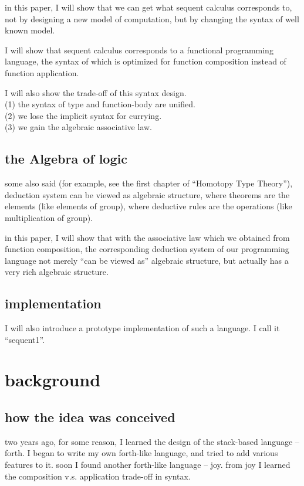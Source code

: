 \documentclass{sigplanconf}
\begin{document}
in this paper, I will show that
we can get what sequent calculus corresponds to,
not by designing a new model of computation,
but by changing the syntax of well known model.

I will show that
sequent calculus corresponds to a functional programming language,
the syntax of which is optimized for function composition
instead of function application.

I will also show the trade-off of this syntax design. \\
(1) the syntax of type and function-body are unified. \\
(2) we lose the implicit syntax for currying. \\
(3) we gain the algebraic associative law.

\subsection{the Algebra of logic}

some also said (for example, see the first chapter of ``Homotopy Type Theory''),
deduction system can be viewed as algebraic structure,
where theorems are the elements (like elements of group),
where deductive rules are the operations (like multiplication of group).

in this paper, I will show that
with the associative law which we obtained from function composition,
the corresponding deduction system of our programming language
not merely ``can be viewed as'' algebraic structure,
but actually has a very rich algebraic structure.

\subsection{implementation}

I will also introduce a prototype implementation of such a language.
I call it ``sequent1''.

\section{background}

\subsection{how the idea was conceived}

two years ago,
for some reason, I learned the design of the stack-based language -- forth.
I began to write my own forth-like language,
and tried to add various features to it.
soon I found another forth-like language -- joy.
from joy I learned the composition v.s. application trade-off in syntax.
\end{document}
